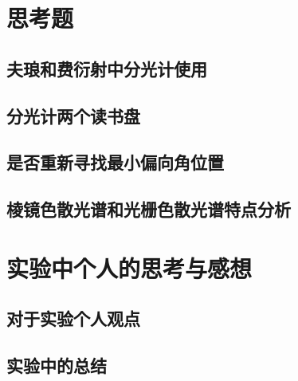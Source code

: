 \documentclass{ctexart}
\begin{document}
\newpage

\section{思考题}
  \subsection{夫琅和费衍射中分光计使用}

  \subsection{分光计两个读书盘}

  \subsection{是否重新寻找最小偏向角位置}

  \subsection{棱镜色散光谱和光栅色散光谱特点分析}

\newpage

\section{实验中个人的思考与感想}
  \subsection{对于实验个人观点}
  
  \subsection{实验中的总结}
\end{document}

